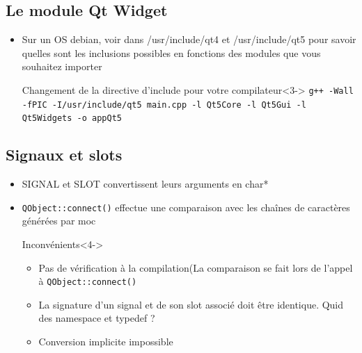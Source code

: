 \documentclass{beamer} %
\begin{document}
\subsection{Le module Qt Widget}
\begin{frame}[fragile]
	\begin{itemize}
		\begin{exampleblock}{Portage de Qt4 à Qt5}<1->
		\begin{lstlisting}
			#include "QtGui/QtGui"
			// devient
			#include "QtWidgets/QtWidgets"
		\end{lstlisting}
		\end{exampleblock}
	\item<2-> Sur un OS debian, voir dans /usr/include/qt4 et /usr/include/qt5 pour savoir quelles sont les inclusions possibles en fonctions des modules que vous souhaitez importer
	\begin{alertblock}{Changement de la directive d'include pour votre compilateur}<3->
		\texttt{g++ -Wall \color{red}-fPIC \color{black} -I/usr/include/qt\color{red}5 \color{black} main.cpp -l Qt\color{red}5\color{black}Core -l Qt\color{red}5\color{black}Gui \color{red}-l Qt5Widgets \color{black} -o appQt5}
	\end{alertblock}
	\end{itemize}
\end{frame}

\subsection{Signaux et slots }
\begin{frame}[fragile]
	\begin{itemize}
			\begin{exampleblock}{Syntaxe Qt4}<1->
		\begin{lstlisting}
			connect(sender, SIGNAL(valueChanged(QString, QString)),
				receiver, SLOT(updateValue(QString)) );
		\end{lstlisting}
	\end{exampleblock}
	\item<2->SIGNAL et SLOT convertissent leurs arguments en char*
	\item<3->\texttt{QObject::connect()} effectue une comparaison avec les chaînes de caractères générées par moc
		\begin{alertblock}{Inconvénients}<4->
			\begin{itemize}
				\item<4-> Pas de vérification à la compilation(La comparaison se fait lors de l'appel à \texttt{QObject::connect()}
				\item<5-> La signature d'un signal et de son slot associé doit être identique. Quid des namespace et typedef ?
				\item<6-> Conversion implicite impossible
		\end{itemize}
		\end{alertblock}
	\end{itemize}
\end{frame}
\end{document}
